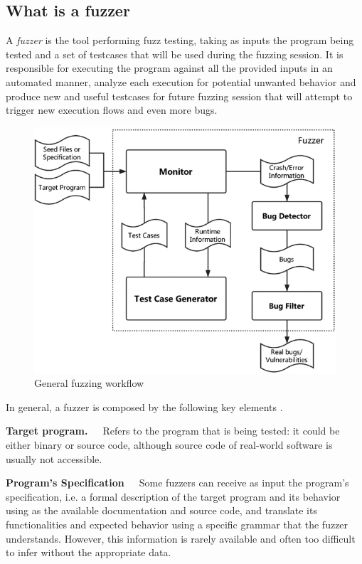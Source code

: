 \subsection{What is a fuzzer}  \label{fuzzers}
A \textit{fuzzer} is the tool performing fuzz testing, taking as inputs the program being tested and a set of testcases that will be used during the fuzzing session. It is responsible for executing the program against all the provided inputs in an automated manner, analyze each execution for potential unwanted behavior and produce new and useful testcases for future fuzzing session that will attempt to trigger new execution flows and even more bugs.
\begin{figure}[h]
\centering
\includegraphics[scale=0.46]{foto/fuzzing_workflow.png}
\caption{General fuzzing workflow \cite{fuzzing_survey}}
\label{fig:fuzzing_workflow}
\end{figure}

In general, a fuzzer is composed by the following key elements \cite{afl_docs} \cite{fuzzing_survey}.

\textbf{Target program.}\ \ \ Refers to the program that is being tested: it could be either binary or source code, although source code of real-world software is usually not accessible.

\textbf{Program's Specification}\ \ \ Some fuzzers can receive as input the program's specification, i.e. a formal description of the target program and its behavior using as the available documentation and source code, and translate its functionalities and expected behavior using a specific grammar that the fuzzer understands. However, this information is rarely available and often too difficult to infer without the appropriate data.

